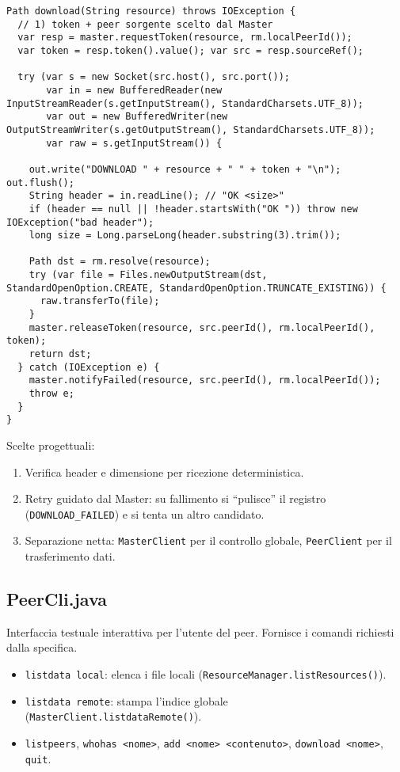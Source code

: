 \documentclass[a4paper,12pt]{article}
\begin{document}
\begin{lstlisting}
Path download(String resource) throws IOException {
  // 1) token + peer sorgente scelto dal Master
  var resp = master.requestToken(resource, rm.localPeerId());
  var token = resp.token().value(); var src = resp.sourceRef();

  try (var s = new Socket(src.host(), src.port());
       var in = new BufferedReader(new InputStreamReader(s.getInputStream(), StandardCharsets.UTF_8));
       var out = new BufferedWriter(new OutputStreamWriter(s.getOutputStream(), StandardCharsets.UTF_8));
       var raw = s.getInputStream()) {

    out.write("DOWNLOAD " + resource + " " + token + "\n"); out.flush();
    String header = in.readLine(); // "OK <size>"
    if (header == null || !header.startsWith("OK ")) throw new IOException("bad header");
    long size = Long.parseLong(header.substring(3).trim());

    Path dst = rm.resolve(resource);
    try (var file = Files.newOutputStream(dst, StandardOpenOption.CREATE, StandardOpenOption.TRUNCATE_EXISTING)) {
      raw.transferTo(file);
    }
    master.releaseToken(resource, src.peerId(), rm.localPeerId(), token);
    return dst;
  } catch (IOException e) {
    master.notifyFailed(resource, src.peerId(), rm.localPeerId());
    throw e;
  }
}
\end{lstlisting}

Scelte progettuali:
\begin{enumerate}[nosep]
  \item Verifica header e dimensione per ricezione deterministica.
  \item Retry guidato dal Master: su fallimento si “pulisce” il registro (\texttt{DOWNLOAD\_FAILED}) e si tenta un altro candidato.
  \item Separazione netta: \texttt{MasterClient} per il controllo globale, \texttt{PeerClient} per il trasferimento dati.
\end{enumerate}

\subsection*{PeerCli.java}
Interfaccia testuale interattiva per l’utente del peer. Fornisce i comandi richiesti dalla specifica.
\begin{itemize}[nosep]
  \item \texttt{listdata local}: elenca i file locali (\texttt{ResourceManager.listResources()}).
  \item \texttt{listdata remote}: stampa l’indice globale (\texttt{MasterClient.listdataRemote()}).
  \item \texttt{listpeers}, \texttt{whohas <nome>}, \texttt{add <nome> <contenuto>}, \texttt{download <nome>}, \texttt{quit}.
\end{itemize}
\end{document}
